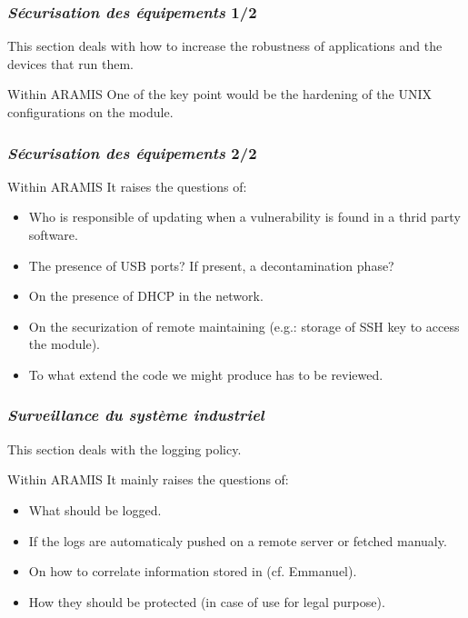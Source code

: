 \begin{frame}
    \frametitle{{\em S\'ecurisation des \'equipements} 1/2}

    This section deals with how to increase the robustness of applications and the devices that run them.
    \vfill
    \begin{block}{Within ARAMIS}
        One of the key point would be the hardening of the UNIX configurations on the module.\\
    \end{block}
\end{frame}

\begin{frame}
    \frametitle{{\em S\'ecurisation des \'equipements} 2/2}
    
    \begin{block}{Within ARAMIS}
        It raises the questions of:
        \begin{itemize}
            \item Who is responsible of updating when a vulnerability is found in a thrid party software.
            \item The presence of USB ports? If present, a decontamination phase?
            \item On the presence of DHCP in the network.
            \item On the securization of remote maintaining (e.g.: storage of SSH key to access the module).
            \item To what extend the code we might produce has to be reviewed.
        \end{itemize}
    \end{block}
\end{frame}

\begin{frame}
    \frametitle{{\em Surveillance du syst\`eme industriel}}

    This section deals with the logging policy.
    \vfill
    \begin{block}{Within ARAMIS}
        It mainly raises the questions of:
        \begin{itemize}
            \item What should be logged.
            \item If the logs are automaticaly pushed on a remote server or fetched manualy.
            \item On how to correlate information stored in (cf. Emmanuel).
            \item How they should be protected (in case of use for legal purpose).
        \end{itemize}
    \end{block}
\end{frame}
